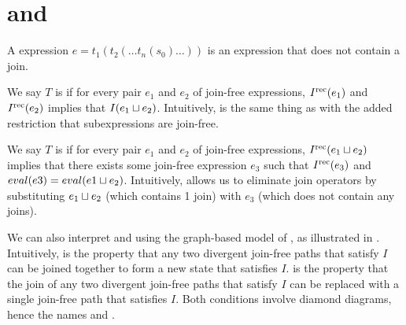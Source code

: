 \section{\dIconfluence{} and \dIreduction{}}
A  expression $e = t_1(t_2(\ldots t_n(s_0) \ldots))$ is an
expression that does not contain a join.

We say $T$ is  if for every pair $e_1$ and $e_2$ of
join-free expressions, $I^{\text{rec}}(e_1)$ and $I^{\text{rec}}(e_2)$ implies that $I(e_1 \sqcup
e_2)$. Intuitively, \dIconfluence{} is the same thing as \Iconfluence{} with
the added restriction that subexpressions are join-free.

We say $T$ is  if for every pair $e_1$ and $e_2$ of
join-free expressions, $I^{\text{rec}}(e_1 \sqcup e_2)$ implies that there exists some
join-free expression $e_3$ such that $I^{\text{rec}}(e_3)$ and $eval(e3) = eval(e1 \sqcup
e_2)$.  Intuitively, \dIreduction{} allows us to eliminate join operators by
substituting $e_1 \sqcup e_2$ (which contains 1 join) with $e_3$ (which does not
contain any joins).



We can also interpret \dIconfluence{} and \dIreduction{} using the graph-based
model of \Iconfluence{}, as illustrated in
. Intuitively, \dIconfluence{} is the
property that any two divergent join-free paths that satisfy $I$ can be joined
together to form a new state that satisfies $I$. \dIreduction{} is the property
that the join of any two divergent join-free paths that satisfy $I$ can be
replaced with a single join-free path that satisfies $I$. Both conditions
involve diamond diagrams, hence the names \dIconfluence{} and \dIreduction{}.

